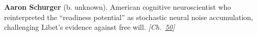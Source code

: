 \textbf{Aaron Schurger} (b. unknown). American cognitive neuroscientist who reinterpreted the ``readiness potential'' as stochastic neural noise accumulation, challenging Libet's evidence against free will. \emph{[Ch.~\hyperref[ch:consciousness]{50}]}

